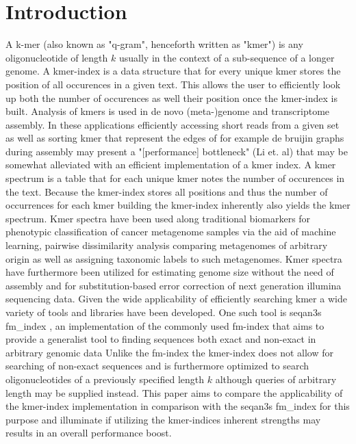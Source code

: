\chapter{Introduction}
A k-mer (also known as "q-gram", henceforth written as "kmer") is any oligonucleotide of length $k$ usually in the
context of a sub-sequence of a longer genome. A kmer-index is a data structure that for every unique kmer
stores the position of all occurences in a given text. This allows the user to efficiently look up both the number of
occurences as well their position once the kmer-index is built. Analysis of kmers is used in de novo (meta-)genome\cite{megahit}
and transcriptome\cite{SOAPdenovo-Trans} assembly. In these applications efficiently accessing short reads from a given
set as well as sorting kmer that represent the edges of for example de bruijin graphs during assembly may present a
"[performance] bottleneck" (Li et. al) that may be somewhat alleviated with an efficient implementation of a kmer index.
A kmer spectrum is a table that for each unique kmer notes the number of occurences in the text. Because the kmer-index
stores all positions and thus the number of occurrences for each kmer building the kmer-index inherently also yields
the kmer spectrum. Kmer spectra have been used along traditional biomarkers for phenotypic classification of cancer
metagenome samples via the aid of machine learning\cite{phenotype:classification:with:kmer:spectrum}, pairwise dissimilarity
analysis comparing metagenomes of arbitrary origin\cite{kmer:spectrum:dissimilarity} as well as assigning taxonomic labels
to such metagenomes\cite{kraken:metagenome:classification}. Kmer spectra have furthermore been utilized for estimating genome
size without the need of assembly\cite{genome:size:estimation} and for substitution-based error correction
of next generation illumina sequencing data\cite{musket:kmer:spectrum:error:correction}.
\newline
Given the wide applicability of efficiently searching kmer a wide variety of tools and libraries have been developed.
One such tool is seqan3s fm\_index \cite{fm:index:master:thesis}, an implementation of the commonly used
fm-index that aims to provide a generalist tool to finding sequences both exact and non-exact in arbitrary genomic data
Unlike the fm-index the kmer-index does not allow for searching of non-exact sequences and is furthermore optimized to
search oligonucleotides of a previously specified length $k$ although queries of arbitrary length may be supplied instead.
This paper aims to compare the applicability of the kmer-index implementation in comparison with the seqan3s fm\_index
for this purpose and illuminate if utilizing the kmer-indices inherent strengths may results in an overall performance
boost.